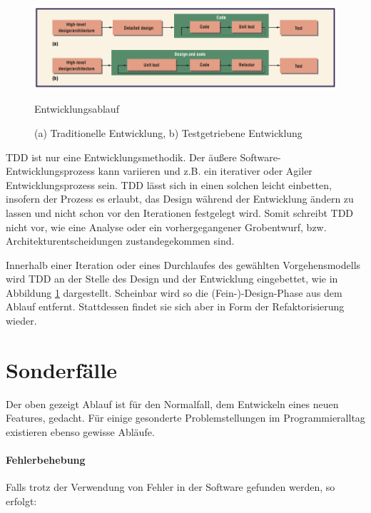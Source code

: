     \begin{figure}[hbtp]
 \centering
 \includegraphics[width=\textwidth]{./diagrams/ablauf.png}
 \caption{Entwicklungsablauf}
 \caption*{(a) Traditionelle Entwicklung,  b) Testgetriebene Entwicklung}
 \label{fig:devflow}
\end{figure}

 TDD ist nur eine Entwicklungsmethodik. Der äußere Software-Entwicklungsprozess kann variieren und z.B. ein iterativer oder Agiler Entwicklungsprozess sein. TDD lässt sich in einen solchen leicht einbetten, insofern der Prozess es erlaubt, das Design während der Entwicklung ändern zu lassen und nicht schon vor den Iterationen festgelegt wird. Somit schreibt TDD nicht vor, wie eine Analyse oder ein vorhergegangener Grobentwurf, bzw. Architekturentscheidungen zustandegekommen sind.

 Innerhalb einer Iteration oder eines Durchlaufes des gewählten Vorgehensmodells wird TDD an der Stelle des Design und der Entwicklung eingebettet, wie in Abbildung \ref{fig:devflow} dargestellt. Scheinbar wird so die (Fein-)-Design-Phase aus dem Ablauf entfernt. Stattdessen findet sie sich aber in Form der Refaktorisierung wieder.


  \section{Sonderfälle}
  \label{sec:tddspecialcircumstances}

  Der oben gezeigt Ablauf ist für den Normalfall, dem Entwickeln eines neuen Features, gedacht. Für einige gesonderte Problemstellungen im Programmieralltag existieren ebenso gewisse Abläufe.

  \paragraph{Fehlerbehebung} Falls trotz der Verwendung von  Fehler in der Software gefunden werden, so erfolgt:

